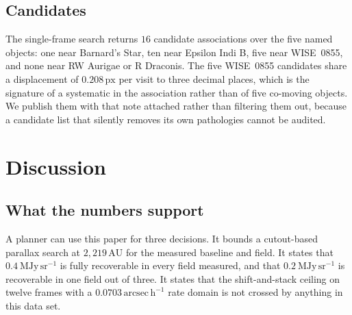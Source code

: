 \documentclass[11pt,a4paper]{article}
\newcommand{\unit}[1]{\,\mathrm{#1}}
\newcommand{\mjysr}{\ \mathrm{MJy\,sr^{-1}}}
\newcommand{\arcsec}{\unit{arcsec}}
\newcommand{\au}{\unit{AU}}
\newcommand{\px}{\unit{px}}
\begin{document}
\subsection{Candidates}
The single-frame search returns $16$ candidate associations over the five named
objects: one near Barnard's Star, ten near Epsilon Indi B, five near WISE~0855,
and none near RW Aurigae or R Draconis. The five WISE~0855 candidates share a
displacement of $0.208\px$ per visit to three decimal places, which is the
signature of a systematic in the association rather than of five co-moving
objects. We publish them with that note attached rather than filtering them out,
because a candidate list that silently removes its own pathologies cannot be
audited.

\section{Discussion}\label{sec:discussion}

\subsection{What the numbers support}
A planner can use this paper for three decisions. It bounds a cutout-based
parallax search at $2{,}219\au$ for the measured baseline and field. It states
that $0.4\mjysr$ is fully recoverable in every field measured, and that
$0.2\mjysr$ is recoverable in one field out of three. It states that the
shift-and-stack ceiling on twelve frames with a $0.0703\arcsec\unit{h}^{-1}$ rate
domain is not crossed by anything in this data set.
\end{document}
